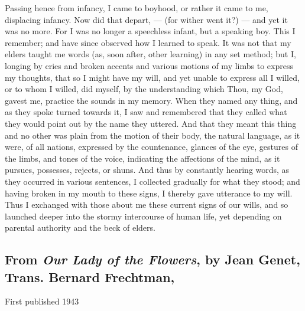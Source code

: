 \documentclass[
]{memoir}
\begin{document}
Passing hence from infancy, I came to boyhood, or rather it came to me,
displacing infancy. Now did that depart, --- (for wither went it?) ---
and yet it was no more. For I was no longer a speechless infant, but a
speaking boy. This I remember; and have since observed how I learned to
speak. It was not that my elders taught me words (as, soon after, other
learning) in any set method; but I, longing by cries and broken accents
and various motions of my limbs to express my thoughts, that so I might
have my will, and yet unable to express all I willed, or to whom I
willed, did myself, by the understanding which Thou, my God, gavest me,
practice the sounds in my memory. When they named any thing, and as they
spoke turned towards it, I saw and remembered that they called what they
would point out by the name they uttered. And that they meant this thing
and no other was plain from the motion of their body, the natural
language, as it were, of all nations, expressed by the countenance,
glances of the eye, gestures of the limbs, and tones of the voice,
indicating the affections of the mind, as it pursues, possesses,
rejects, or shuns. And thus by constantly hearing words, as they
occurred in various sentences, I collected gradually for what they
stood; and having broken in my mouth to these signs, I thereby gave
utterance to my will. Thus I exchanged with those about me these current
signs of our wills, and so launched deeper into the stormy intercourse
of human life, yet depending on parental authority and the beck of
elders.

\hypertarget{from-our-lady-of-the-flowers-by-jean-genet-trans.-bernard-frechtman}{%
\subsection*{\texorpdfstring{From \emph{Our Lady of the Flowers}, by
Jean Genet, Trans. Bernard
Frechtman,}{From Our Lady of the Flowers, by Jean Genet, Trans. Bernard Frechtman,}}\label{from-our-lady-of-the-flowers-by-jean-genet-trans.-bernard-frechtman}}

First published 1943
\end{document}
